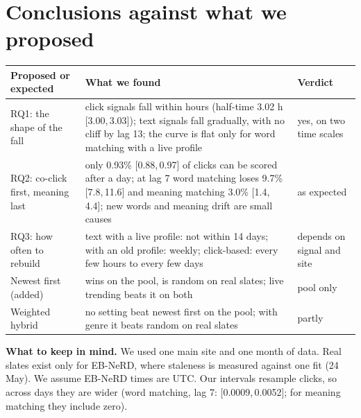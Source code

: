 \documentclass[11pt,a4paper]{article}
\newcommand{\ci}[2]{[#1,\,#2]}
\begin{document}
\section{Conclusions against what we proposed}
\begin{center}\small
\setlength{\tabcolsep}{4pt}
\begin{tabularx}{\linewidth}{@{}>{\raggedright\arraybackslash}p{3.2cm}>{\raggedright\arraybackslash}X>{\raggedright\arraybackslash}p{2.1cm}@{}}
\toprule
\textbf{Proposed or expected} & \textbf{What we found} & \textbf{Verdict}\\
\midrule
RQ1: the shape of the fall & click signals fall within hours (half-time 3.02 h \ci{3.00}{3.03}); text signals fall gradually, with no cliff by lag 13; the curve is flat only for word matching with a live profile & yes, on two time scales\\
RQ2: co-click first, meaning last & only 0.93\% \ci{0.88}{0.97} of clicks can be scored after a day; at lag 7 word matching loses 9.7\% \ci{7.8}{11.6} and meaning matching 3.0\% \ci{1.4}{4.4}; new words and meaning drift are small causes & as expected\\
RQ3: how often to rebuild & text with a live profile: not within 14 days; with an old profile: weekly; click-based: every few hours to every few days & depends on signal and site\\
Newest first (added) & wins on the pool, is random on real slates; live trending beats it on both & pool only\\
Weighted hybrid & no setting beat newest first on the pool; with genre it beats random on real slates & partly\\
\bottomrule
\end{tabularx}
\end{center}
\textbf{What to keep in mind.} We used one main site and one month of data. Real slates exist only for EB-NeRD, where staleness is measured against one fit (24 May). We assume EB-NeRD times are UTC. Our intervals resample clicks, so across days they are wider (word matching, lag 7: \ci{0.0009}{0.0052}; for meaning matching they include zero).
\end{document}
